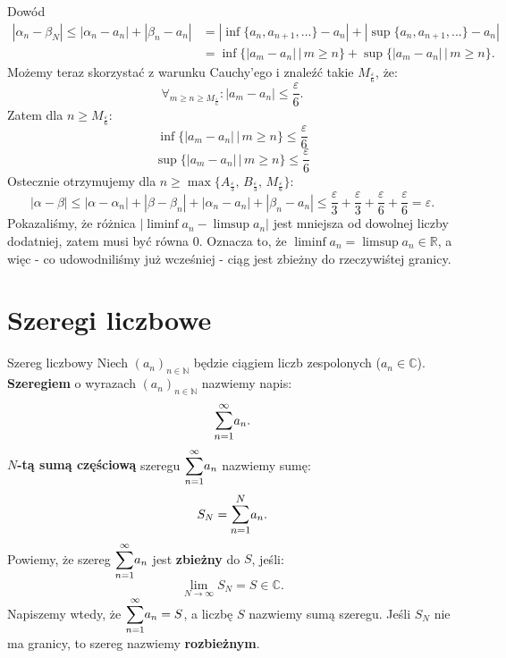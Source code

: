 \documentclass{article}
\numberwithin{defi}{section}
\numberwithin{defi}{section}
\newcommand{\R}{\mathbb{R}}
\newcommand{\N}{\mathbb{N}}
\newcommand{\C}{\mathbb{C}}
\newcommand{\oo}{\infty}
\providecommand{\eps}{\varepsilon}
\newcommand{\bsum}[2]{\mathlarger{\sum_{#1}^{#2}}}
\newcommand{\szerI}[1]{\bsum{n=1}{\oo} #1_n}
\newcommand{\ciag}[1]{(#1_{n})_{n \in \N}}
\newcommand{\gras}[2]{\lim_{#1 \to \oo} #2_{#1}}
\begin{document}
\begin{dow}{Dowód}
\begin{equation}
\begin{split}
            |\alpha_n - \beta_N| \leqslant |\alpha_n - a_n| + |\beta_n - a_n| & = |\inf\{a_n, a_{n+1}, ...\} - a_n| + |\sup\{a_n, a_{n+1}, ...\} - a_n| \\
            & = \inf\{ |a_m - a_n| \, \big| \, m \geqslant n \} + \sup\{ |a_m - a_n| \, \big| \, m \geqslant n \}.
        \end{split} \end{equation}
    Możemy teraz skorzystać z warunku Cauchy'ego i znaleźć takie $M_{\frac{\eps}{6}}$, że: \begin{equation}
        \forall_{m \geqslant n \geqslant M_{\frac{\eps}{6}}}: |a_m - a_n| \leqslant \frac{\eps}{6}.
    \end{equation} Zatem dla $n \geqslant M_{\frac{\eps}{6}}$:\begin{equation}
        \inf\{ |a_m - a_n| \, \big| \, m \geqslant n \} \leqslant \frac{\eps}{6}
    \end{equation} \begin{equation}
        \sup\{ |a_m - a_n| \, \big| \, m \geqslant n \} \leqslant \frac{\eps}{6}
    \end{equation}
    Ostecznie otrzymujemy dla $n \geqslant \max \{A_{\frac{\eps}{3}}, \, B_{\frac{\eps}{3}}, \, M_{\frac{\eps}{6}}\}$: \begin{equation}
        |\alpha - \beta| \leqslant |\alpha - \alpha_n| + |\beta - \beta_n| +  |\alpha_n - a_n| + |\beta_n - a_n| \leqslant \frac{\eps}{3} + \frac{\eps}{3} + \frac{\eps}{6} + \frac{\eps}{6} = \eps.
    \end{equation}
    Pokazaliśmy, że różnica $|\liminf a_n - \limsup a_n|$ jest mniejsza od dowolnej liczby dodatniej, zatem musi być równa $0$. Oznacza to, że $\liminf a_n = \limsup a_n \in \R$, a więc - co udowodniliśmy już wcześniej - ciąg jest zbieżny do rzeczywiśtej granicy.
\end{dow}



\section{Szeregi liczbowe}
\begin{defr}{Szereg liczbowy}
    Niech $\ciag{a}$ będzie ciągiem liczb zespolonych ($a_n \in \C$). \textbf{Szeregiem} o wyrazach $\ciag{a}$ nazwiemy napis: \begin{equation}
        \bsum{n=1}{\oo} a_n.
    \end{equation} \textbf{$N$-tą sumą częściową} szeregu $\szerI{a}$ nazwiemy sumę: \begin{equation}
        S_N = \bsum{n=1}{N} a_n.
    \end{equation} Powiemy, że szereg $\szerI{a}$ jest \textbf{zbieżny} do $S$, jeśli: \begin{equation}
        \gras{N}{S} = S \in \C.
    \end{equation} Napiszemy wtedy, że $\szerI{a} = S$, a liczbę $S$ nazwiemy sumą szeregu. Jeśli $S_N$ nie ma granicy, to szereg nazwiemy \textbf{rozbieżnym}.
\end{defr}
\end{document}
